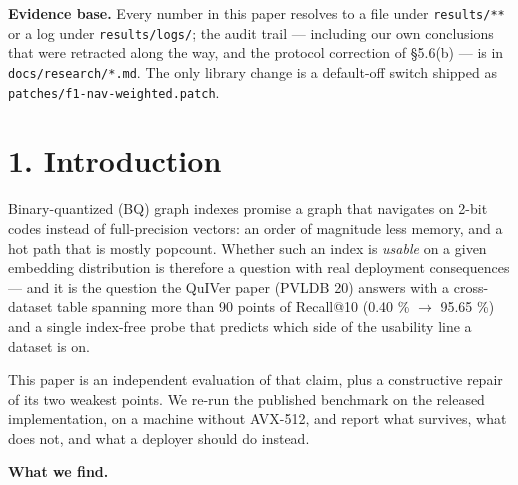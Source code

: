 \documentclass[
  10pt,
]{article}
\begin{document}
{
\setcounter{tocdepth}{3}
\tableofcontents
}
\textbf{Evidence base.} Every number in this paper resolves to a file
under \texttt{results/**} or a log under \texttt{results/logs/}; the
audit trail --- including our own conclusions that were retracted along
the way, and the protocol correction of §5.6(b) --- is in
\texttt{docs/research/*.md}. The only library change is a default-off
switch shipped as \texttt{patches/f1-nav-weighted.patch}.

\section{1. Introduction}\label{introduction}

Binary-quantized (BQ) graph indexes promise a graph that navigates on
2-bit codes instead of full-precision vectors: an order of magnitude
less memory, and a hot path that is mostly popcount. Whether such an
index is \emph{usable} on a given embedding distribution is therefore a
question with real deployment consequences --- and it is the question
the QuIVer paper (PVLDB 20) answers with a cross-dataset table spanning
more than 90 points of Recall@10 (0.40 \% $\rightarrow$ 95.65 \%) and a single
index-free probe that predicts which side of the usability line a
dataset is on.

This paper is an independent evaluation of that claim, plus a
constructive repair of its two weakest points. We re-run the published
benchmark on the released implementation, on a machine without AVX-512,
and report what survives, what does not, and what a deployer should do
instead.

\textbf{What we find.}
\end{document}
